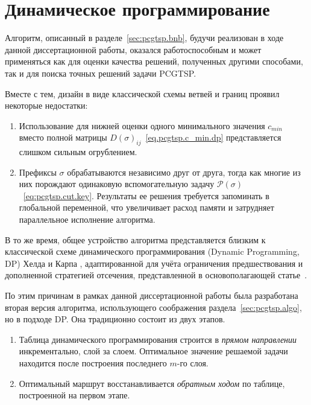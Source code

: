 
\section{Динамическое программирование}
\label{sec:pcgtsp.dp}

Алгоритм, описанный в разделе~\ref{sec:pcgtsp.bnb},
будучи реализован в ходе данной диссертационной работы,
оказался работоспособным и может применяться как
для оценки качества решений, полученных другими способами,
так и для поиска точных решений задачи PCGTSP.

Вместе с тем, дизайн в виде классической схемы ветвей и границ
проявил некоторые недостатки:

\begin{enumerate}
  \item
  Использование для нижней оценки
  одного минимального значения
  $c_{min}$
  вместо полной матрицы
  $D(\sigma)_{ij}$~\eqref{eq.pcgtsp.c_min.dp}
  представляется слишком сильным огрублением.
  \item
  Префиксы $\sigma$ обрабатываются независимо друг от друга,
  тогда как многие из них порождают
  одинаковую вспомогательную задачу
  $\mathcal P(\sigma)$~\eqref{eq:pcgtsp.cut.key}.
  Результаты ее решения требуется запоминать в глобальной переменной,
  что увеличивает расход памяти и затрудняет
  параллельное исполнение алгоритма.
\end{enumerate}

В то же время,
общее устройство алгоритма
представляется близким к классической схеме
динамического программирования
(Dynamic Programming, DP)
Хелда и Карпа
\cite{HeldKarp1962},
адаптированной для учёта ограничения предшествования
и дополненной стратегией отсечения,
представленной в основополагающей статье~\cite{MorinMarsten1976}.

По этим причинам
в рамках данной диссертационной работы
была разработана вторая версия алгоритма,
использующего соображения раздела~\ref{sec:pcgtsp.algo},
но в подходе DP.
Она традиционно состоит из двух этапов.
\begin{enumerate}
  \item
  Таблица динамического программирования строится в \textit{прямом направлении}
  инкрементально, слой за слоем.
  Оптимальное значение решаемой задачи находится
  после построения последнего $m$-го слоя.
  \item
  Оптимальный маршрут восстанавливается \textit{обратным ходом}
  по таблице,
  построенной на первом этапе.
\end{enumerate}

